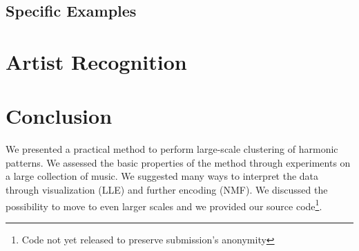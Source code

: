 \documentclass{article}
\begin{document}
\subsection{Specific Examples}



\section{Artist Recognition}





\section{Conclusion}
We presented a practical method to perform large-scale clustering of
harmonic patterns. We assessed the basic properties of the method through
experiments on a large collection of music. We suggested many ways
to interpret the data through visualization (LLE) and further encoding
(NMF). We discussed the possibility to move to even larger scales
and we provided our source code\footnote{Code not yet released to preserve
submission's anonymity}.
\end{document}
